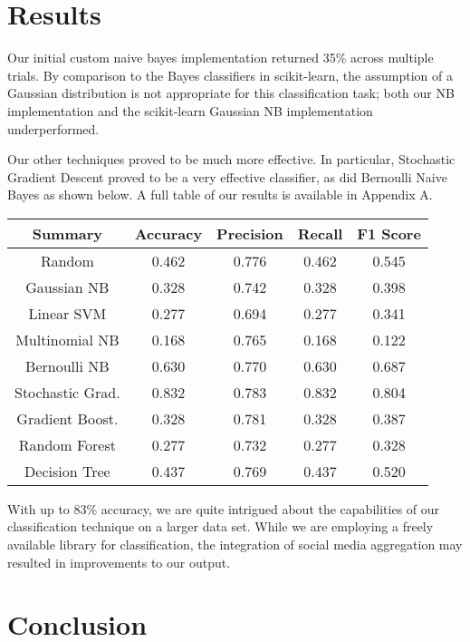 \documentclass[letterpaper]{article}
\begin{document}
\section{Results}

\noindent Our initial custom naive bayes implementation returned 35\% across multiple trials. By comparison to the Bayes classifiers in scikit-learn, the assumption of a Gaussian distribution is not appropriate for this classification task; both our NB implementation and the scikit-learn Gaussian NB implementation underperformed.

Our other techniques proved to be much more effective. In particular, Stochastic Gradient Descent proved to be a very effective classifier, as did Bernoulli Naive Bayes as shown below.  A full table of our results is available in Appendix A.

{\small
\begin{tabular}{c | c c c c}
\textbf{Summary}    & Accuracy  & Precision & Recall    & F1 Score  \\
\hline
Random      & 0.462     & 0.776     & 0.462     & 0.545     \\
Gaussian NB     & 0.328     & 0.742     & 0.328     & 0.398     \\
Linear SVM      & 0.277     & 0.694     & 0.277     & 0.341     \\
Multinomial NB     & 0.168     & 0.765     & 0.168     & 0.122     \\
Bernoulli NB       & 0.630     & 0.770     & 0.630     & 0.687     \\
Stochastic Grad.     & 0.832     & 0.783     & 0.832     & 0.804     \\
Gradient Boost.        & 0.328     & 0.781     & 0.328     & 0.387     \\
Random Forest        & 0.277     & 0.732     & 0.277     & 0.328     \\
Decision Tree        & 0.437     & 0.769     & 0.437     & 0.520     \\
\end{tabular}
}

With up to 83\% accuracy, we are quite intrigued about the capabilities of our classification technique on a larger data set. While we are employing a freely available library for classification, the integration of social media aggregation may resulted in improvements to our output.

\section{Conclusion}
\end{document}
